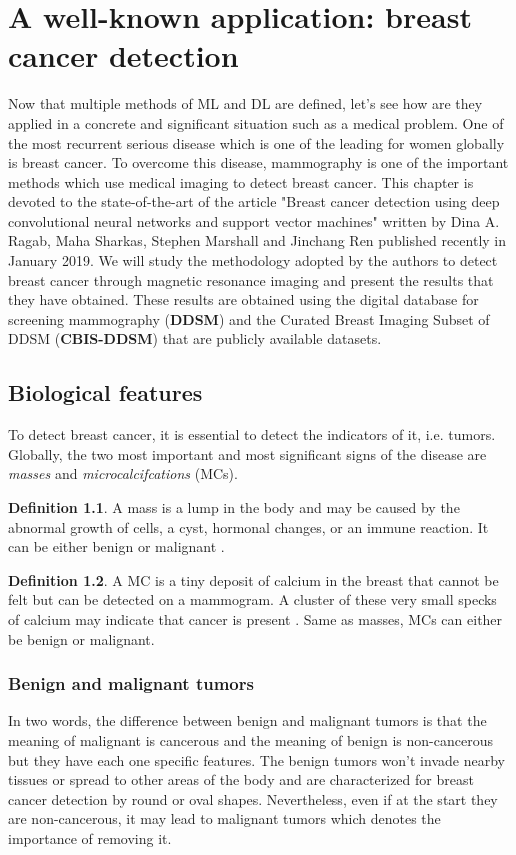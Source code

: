 \documentclass[11pt, openany]{report}
\theoremstyle{plain}
\theoremstyle{definition}
\newtheorem{defn}{Definition}[section]
\theoremstyle{remark}
\begin{document}
\chapter{A well-known application: breast cancer detection} \label{chap:breast-cancer}
Now that multiple methods of ML and DL are defined, let's see how are they applied in a concrete and significant situation such as a medical problem. One of the most recurrent serious disease which is one of the leading for women globally is breast cancer. To overcome this disease, mammography is one of the important methods which use medical imaging to detect breast cancer. This chapter is devoted to the state-of-the-art of the article "Breast cancer detection using deep convolutional neural networks and support vector machines" \cite{breast-cancer} written by Dina A. Ragab, Maha Sharkas, Stephen Marshall and Jinchang Ren published recently in January 2019. We will study the methodology adopted by the authors to detect breast cancer through magnetic resonance imaging and present the results that they have obtained. These results are obtained using the digital database for screening mammography (\textbf{DDSM}) and the Curated Breast Imaging Subset of DDSM (\textbf{CBIS-DDSM}) that are publicly available datasets.

\section{Biological features}
To detect breast cancer, it is essential to detect the indicators of it, i.e. tumors. Globally, the two most important and most significant signs of the disease are \textit{masses} and \textit{microcalcifcations} (MCs).  

\begin{defn}
A mass is a lump in the body and may be caused by the abnormal growth of cells, a cyst, hormonal changes, or an immune reaction. It can be either benign or malignant \cite{NCI}.
\end{defn}  

\begin{defn}
A MC is a tiny deposit of calcium in the breast that cannot be felt but can be detected on a mammogram. A cluster of these very small specks of calcium may indicate that cancer is present \cite{NCI}. Same as masses, MCs can either be benign or malignant.  
\end{defn}

\subsection{Benign and malignant tumors}
In two words, the difference between benign and malignant tumors is that the meaning of malignant is cancerous and the meaning of benign is non-cancerous but they have each one specific features. The benign tumors won't invade nearby tissues or spread to other areas of the body and are characterized for breast cancer detection by round or oval shapes. Nevertheless, even if at the start they are non-cancerous, it may lead to malignant tumors which denotes the importance of removing it. 
\end{document}
